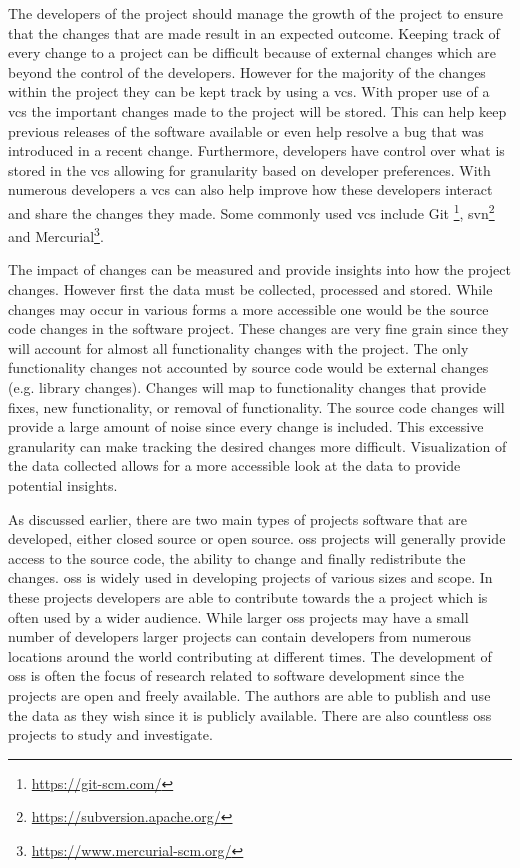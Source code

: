 The developers of the project should manage the growth of the project to ensure that the changes that are made result in an expected outcome. Keeping track of every change to a project can be difficult because of external changes which are beyond the control of the developers. However for the majority of the changes within the project they can be kept track by using a \gls{vcs}. With proper use of a \gls{vcs} the important changes made to the project will be stored. This can help keep previous releases of the software available or even help resolve a bug that was introduced in a recent change. Furthermore, developers have control over what is stored in the \gls{vcs} allowing for granularity based on developer preferences. With numerous developers a \gls{vcs} can also help improve how these developers interact and share the changes they made. Some commonly used \gls{vcs} include Git \footnote{\url{https://git-scm.com/}}, \gls{svn}\footnote{\url{https://subversion.apache.org/}} and Mercurial\footnote{\url{https://www.mercurial-scm.org/}}.

The impact of changes can be measured and provide insights into how the project changes. However first the data must be collected, processed and stored. While changes may occur in various forms a more accessible one would be the source code changes in the software project. These changes are very fine grain since they will account for almost all functionality changes with the project. The only functionality changes not accounted by source code would be external changes (e.g. library changes). Changes will map to functionality changes that provide fixes, new functionality, or removal of functionality. The source code changes will provide a large amount of noise since every change is included. This excessive granularity can make tracking the desired changes more difficult. Visualization of the data collected allows for a more accessible look at the data to provide potential insights.



As discussed earlier, there are two main types of projects software that are developed, either closed source or open source. \gls{oss} projects will generally provide access to the source code, the ability to change and finally redistribute the changes. \gls{oss} is widely used in developing projects of various sizes and scope. In these projects developers are able to contribute towards the a project which is often used by a wider audience. While larger \gls{oss} projects may have a small number of developers larger projects can contain developers from numerous locations around the world contributing at different times. The development of \gls{oss} is often the focus of research related to software development since the projects are open and freely available. The authors are able to publish and use the data as they wish since it is publicly available. There are also countless \gls{oss} projects to study and investigate.

